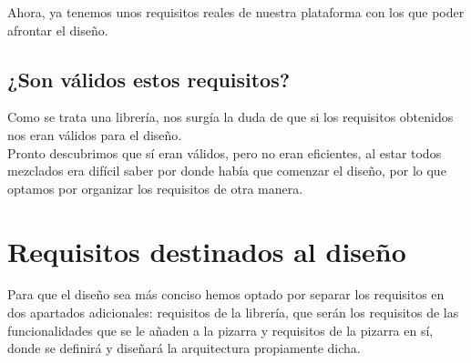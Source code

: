 Ahora, ya tenemos unos requisitos reales de nuestra plataforma con los que poder afrontar el diseño.

\subsection{¿Son válidos estos requisitos?}

Como se trata una librería, nos surgía la duda de que si los requisitos obtenidos nos eran válidos para el diseño.\\

Pronto descubrimos que sí eran válidos, pero no eran eficientes, al estar todos mezclados era difícil saber por donde había que comenzar el diseño, por lo que optamos por organizar los requisitos de otra manera.

\section{Requisitos destinados al diseño}\label{reqdiseño}

Para que el diseño sea más conciso hemos optado por separar los requisitos en dos apartados adicionales: requisitos de la librería, que serán los requisitos de las funcionalidades que se le añaden a la pizarra y requisitos de la pizarra en sí, donde se definirá y diseñará la arquitectura propiamente dicha. 

